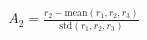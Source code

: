 \documentclass[preview]{standalone}
\begin{document}
\begin{align*}
A_2 = \frac{r_2 - \text{mean}\left({r_1, r_2, r_3}\right)}{\text{std}\left({r_1, r_2, r_3}\right)}
\end{align*}
\end{document}
